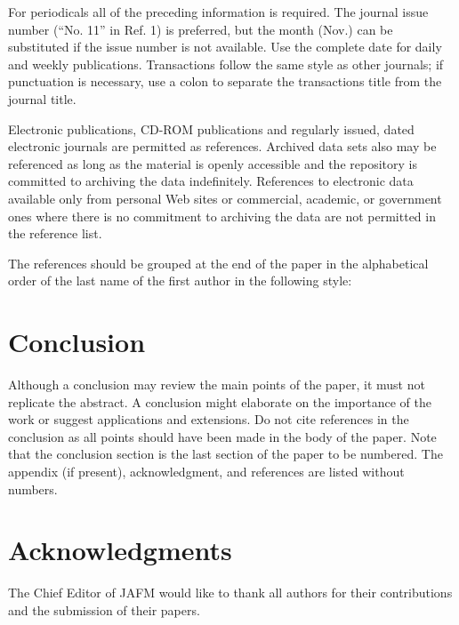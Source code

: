 \documentclass{jafm}
\begin{document}
For periodicals all of the preceding information is required. The journal issue number (``No. 11'' in Ref. 1) is preferred, but the month (Nov.) can be substituted if the issue number is not available. Use the complete date for daily and weekly publications. Transactions follow the same style as other journals; if punctuation is necessary, use a colon to separate the transactions title from the journal title.

Electronic publications, CD-ROM publications and regularly issued, dated electronic journals are permitted as references. Archived data sets also may be referenced as long as the material is openly accessible and the repository is committed to archiving the data indefinitely. References to electronic data available only from personal Web sites or commercial, academic, or government ones where there is no commitment to archiving the data are not permitted in the reference list.

The references should be grouped at the end of the paper in the alphabetical order of the last name of the first author in the following style:
\section{Conclusion}
Although a conclusion may review the main points of the paper, it must not replicate the abstract. A conclusion might elaborate on the importance of the work or suggest applications and extensions. Do not cite references in the conclusion as all points should have been made in the body of the paper. Note that the conclusion section is the last section of the paper to be numbered. The appendix (if present), acknowledgment, and references are listed without numbers.
\section*{Acknowledgments}
The Chief Editor of JAFM would like to thank all authors for their contributions and the submission of their papers.

\end{document}
